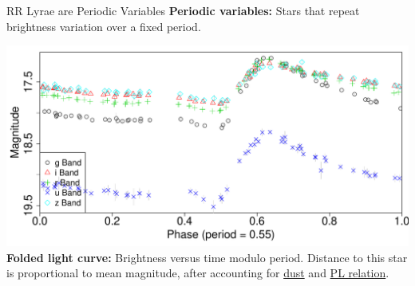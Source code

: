 \documentclass[12pt]{beamer}
\begin{document}
\begin{frame}{RR Lyrae are Periodic Variables}
\textbf{Periodic variables:} Stars that repeat brightness variation over a fixed period.\\

\begin{center}
\includegraphics[scale=.3]{figs/folded_13350.pdf}\\
\textbf{Folded light curve:} Brightness versus time modulo period.
Distance to this star is proportional to mean magnitude, after accounting for \underline{dust} and \underline{PL relation}.
\end{center}
\end{frame}
\end{document}
